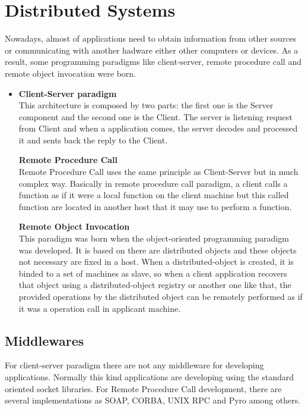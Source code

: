 \section{Distributed Systems}
Nowadays, almost of applications need to obtain information from other sources
or communicating with another hadware either other computers or devices. As a
result, some programming paradigms like client-server, remote procedure call and
remote object invocation were born.
\begin{itemize}
\item \textbf{Client-Server paradigm}~\\
This architecture is composed by two parts: the first one is the Server
component and the second one is the Client. The server is listening request from
Client and when a application comes, the server decodes and processed it and
sents back the reply to the Client.

\textbf{Remote Procedure Call}~\\
Remote Procedure Call uses the same principle as Client-Server but in much
complex way. Basically in remote procedure call paradigm, a client calls a
function as if it were a local function on the client machine but this called
function are located in another host that it may use to perform a function.

\textbf{Remote Object Invocation}~\\
This paradigm was born when the object-oriented programming paradigm was
developed. It is based on there are distributed objects and these objects not
necessary are fixed in a host. When a distributed-object is created, it is
binded to a set of machines as slave, so when a client application recovers that
object using a distributed-object registry or another one like that, the
provided operations by the distributed object can be remotely performed as if
it was a  operation call in applicant machine.
\end{itemize}
\subsection{Middlewares}

For client-server paradigm there are not any middleware for developing
applications. Normally this kind applications are developing using the standard
oriented socket libraries.
For Remote Procedure Call development, there are several implementations as
SOAP, CORBA, UNIX RPC and Pyro among others.

